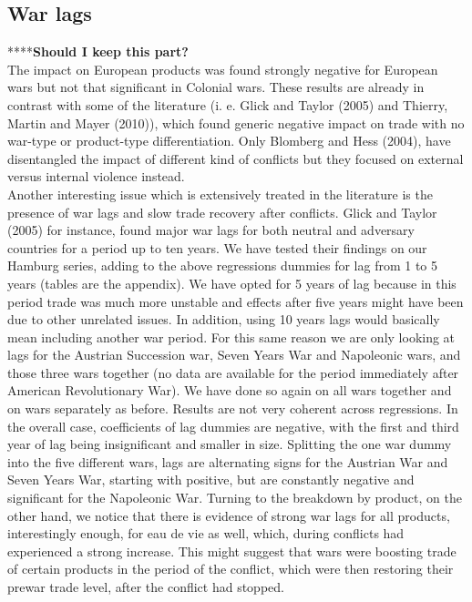 \documentclass[12pt,a4paper,titlepage,english]{article}
\begin{document}
\subsection{War lags}
****\textbf{Should I keep this part?}\\
The impact on European products was found strongly negative for European wars but not that significant in Colonial wars. These results are already in contrast with some of the literature (i. e. Glick and Taylor (2005) and Thierry, Martin and Mayer (2010)), which found generic negative impact on trade with no war-type or product-type differentiation. Only Blomberg and Hess (2004), have disentangled the impact of different kind of conflicts but they focused on external versus internal violence instead.\\
Another interesting issue which is extensively treated in the literature is the presence of war lags and slow trade recovery after conflicts. Glick and Taylor (2005) for instance, found major war lags for both neutral and adversary countries for a period up to ten years. We have tested their findings on our Hamburg series, adding to the above regressions dummies for lag from 1 to 5 years (tables are the appendix). We have opted for 5 years of lag because in this period trade was much more unstable and effects after five years might have been due to other unrelated issues. In addition, using 10 years lags would basically mean including another war period. For this same reason we are only looking at lags for the Austrian Succession war, Seven Years War and Napoleonic wars, and those three wars together (no data are available for the period immediately after American Revolutionary War). We have done so again on all wars together and on wars separately as before. Results are not very coherent across regressions. In the overall case, coefficients of lag dummies are negative, with the first and third year of lag being insignificant and smaller in size. Splitting the one war dummy into the five different wars, lags are alternating signs for the Austrian War and Seven Years War, starting with positive, but are constantly negative and significant for the Napoleonic War.
Turning to the breakdown by product, on the other hand, we notice that there is evidence of strong war lags for all products, interestingly enough, for eau de vie as well, which, during conflicts had experienced a strong increase. This might suggest that wars were boosting trade of certain products in the period of the conflict, which were then restoring their prewar trade level, after the conflict had stopped.\\~\\
\end{document}
